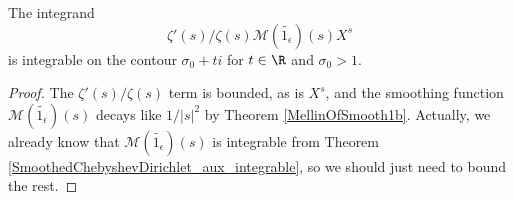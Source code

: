 \begin{lemma}
\label{SmoothedChebyshevPull1_aux_integrable}
\leanok
The integrand $$\zeta'(s)/\zeta(s)\mathcal{M}(\widetilde{1_{\epsilon}})(s)X^{s}$$
  is integrable on the contour $\sigma_0 + t i$ for $t \in \R$ and $\sigma_0 > 1$.
\end{lemma}
\begin{proof}
\leanok
The $\zeta'(s)/\zeta(s)$ term is bounded, as is $X^s$, and the smoothing function
  $\mathcal{M}(\widetilde{1_{\epsilon}})(s)$
  decays like $1/|s|^2$ by Theorem \ref{MellinOfSmooth1b}.
  Actually, we already know that
  $\mathcal{M}(\widetilde{1_{\epsilon}})(s)$
  is integrable from Theorem \ref{SmoothedChebyshevDirichlet_aux_integrable},
  so we should just need to bound the rest.
\end{proof}
